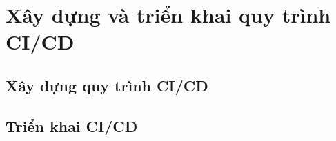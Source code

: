 \chapter {Xây dựng và triển khai quy trình CI/CD}

\section{Xây dựng quy trình CI/CD}

\section{Triển khai CI/CD}


